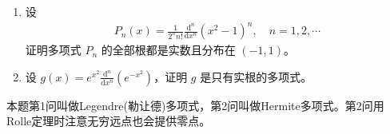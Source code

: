 \documentclass[../../main.tex]{subfiles}%
\begin{document}
\begin{example}
\begin{enumerate}
\item 设
\begin{align}
P_n(x)=\frac{1}{2^n n!}\frac{\mathrm{d}^n}{\mathrm{d}x^n}(x^2 - 1)^n, \quad n = 1, 2, \cdots
\end{align}
证明多项式 \( P_n \) 的全部根都是实数且分布在 \( (-1, 1) \)。

\item 设 \( g(x)=e^{x^2}\frac{\mathrm{d}^n}{\mathrm{d}x^n}(e^{-x^2}) \)，证明 \( g \) 是只有实根的多项式。
\end{enumerate}
\end{example}
\begin{note}
本题第1问叫做Legendre(勒让德)多项式，第2问叫做Hermite多项式。第2问用Rolle定理时注意无穷远点也会提供零点。
\end{note}
\end{document}
